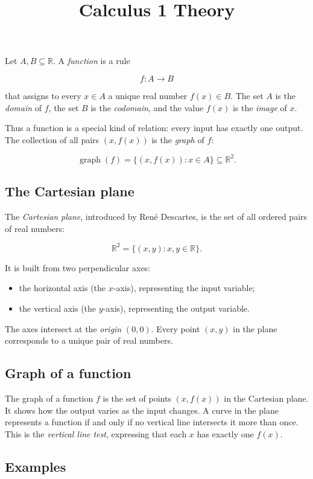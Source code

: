 \documentclass[11pt,a4paper]{article} \usepackage[T1]{fontenc}
\theoremstyle{plain} \newtheorem{theorem}{Theorem} \title{Calculus 1 Theory}
\begin{document}
\begin{definition}
[Function] Let $A,B\subseteq\mathbb{R}$. A \emph{function} is a rule

\[
f : A \to B
\]

that assigns to every $x\in A$ a unique real number $f(x)\in B$. The set $A$ is
the \emph{domain} of $f$, the set $B$ is the \emph{codomain}, and the value
$f(x)$ is the \emph{image} of $x$.
\end{definition}

Thus a function is a special kind of relation: every input has exactly one
output. The collection of all pairs $(x,f(x))$ is the \emph{graph} of $f$:

\[
\operatorname{graph}(f)=\{(x,f(x)) : x\in A\}\subseteq\mathbb{R}^2.
\]

\subsection*{The Cartesian plane}

The \emph{Cartesian plane}, introduced by René Descartes, is the set of all
ordered pairs of real numbers:

\[
\mathbb{R}^2 = \{(x,y) : x,y\in\mathbb{R}\}.
\]

It is built from two perpendicular axes:

\begin{itemize}
\item the horizontal axis (the $x$-axis), representing the input variable;
\item the vertical axis (the $y$-axis), representing the output variable.
\end{itemize}

The axes intersect at the \emph{origin} $(0,0)$. Every point $(x,y)$ in the
plane corresponds to a unique pair of real numbers.

\subsection*{Graph of a function}

The graph of a function $f$ is the set of points $(x,f(x))$ in the Cartesian
plane. It shows how the output varies as the input changes. A curve in the
plane represents a function if and only if no vertical line intersects it more
than once. This is the \emph{vertical line test}, expressing that each $x$ has
exactly one $f(x)$.

\subsection*{Examples}
\end{document}
